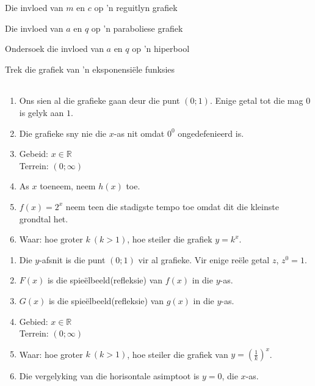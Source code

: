\begin{Ondersoek}{Die invloed van $m$ en $c$ op 'n reguitlyn grafiek}
\begin{Ondersoek}{Die invloed van $a$ en $q$ op 'n paraboliese grafiek}
\begin{Ondersoek}{Ondersoek die invloed van $a$ en $q$ op 'n hiperbool}
\begin{wex}{Trek die grafiek van 'n eksponensiële funksies}
{\begin{table}[H]
\begin{center}
\begin{tabular}{|c|c|c|c|c|c|}
\end{tabular}
\end{center}
\end{table}
\begin{enumerate}[noitemsep, label=\textbf{\arabic*}. ] 
\item Ons sien al die grafieke gaan deur die punt $(0;1)$. Enige getal tot die mag $0$ is gelyk aan $1$.
\item Die grafieke sny nie die $x$-as nit omdat $0^{0}$ ongedefenieerd is.
\item Gebeid: $x \in \mathbb{R}$\\
Terrein: $(0; \infty)$
\item As $x$ toeneem, neem $h(x)$ toe.
\item $f(x)=2^{x}$ neem teen die stadigste tempo toe omdat dit die kleinste grondtal het.
\item Waar: hoe groter $k ~(k>1)$, hoe steiler die grafiek $y=k^{x}$.
\end{enumerate}
\begin{enumerate}[noitemsep, label=\textbf{\arabic*}. ] 
\item Die $y$-afsnit is die punt $(0; 1)$ vir al grafieke. Vir enige re\"ele getal $z$, $z^{0}=1$.
\item $F(x)$ is die spie\"elbeeld(refleksie) van $f(x)$ in die $y$-as. 
\item $G(x)$ is die spie\"elbeeld(refleksie) van $g(x)$ in die $y$-as. 
\item  Gebied: $x \in \mathbb{R}$\\
Terrein: $(0; \infty)$
\item Waar: hoe groter $k ~(k>1)$, hoe steiler die grafiek van $y=(\frac{1}{k})^{x}$.
\item Die vergelyking van die horisontale asimptoot is $y=0$, die $x$-as.
\end{enumerate}

}
\end{wex}



\end{Ondersoek}
\end{Ondersoek}
\end{Ondersoek}
